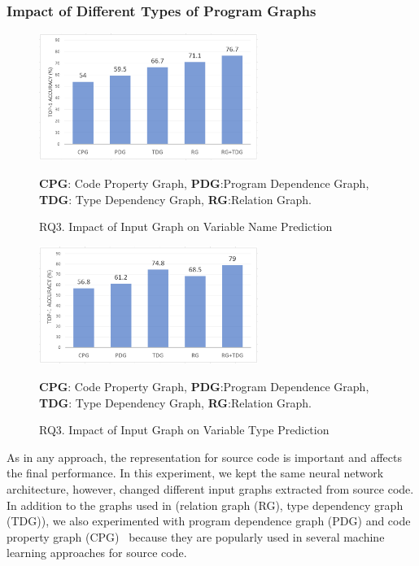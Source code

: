 \subsubsection{Impact of Different Types of Program Graphs}
\label{sec:graphs}

\begin{figure}[thbp]
\begin{center}
\includegraphics[width=2.8in]{figures/sensi-graphs-name}
\vspace{-8pt}
\caption{RQ3. Impact of Input Graph on Variable Name Prediction}
\label{graph-name-result}
{\bf CPG}: Code Property Graph, {\bf PDG}:Program Dependence Graph, {\bf TDG}: Type Dependency Graph, {\bf RG}:Relation Graph. 
\end{center}
\end{figure}

\begin{figure}[thbp]
\begin{center}
\includegraphics[width=2.8in]{figures/sensi-graphs-type}
\vspace{-8pt}
\caption{RQ3. Impact of Input Graph on Variable Type Prediction}
\label{graph-type-result}
{\bf CPG}: Code Property Graph, {\bf PDG}:Program Dependence Graph, {\bf TDG}: Type Dependency Graph, {\bf RG}:Relation Graph.
\end{center}
\end{figure}

As in any approach, the representation for source code is important
and affects the final performance. In this experiment, we kept the
same neural network architecture, however, changed different input
graphs extracted from source code. In addition to the graphs used in
{\tool} (relation graph (RG), type dependency graph (TDG)), we also
experimented with program dependence graph (PDG) and code property
graph (CPG)~\cite{tien} because they are popularly used in several
machine learning approaches for source code.
